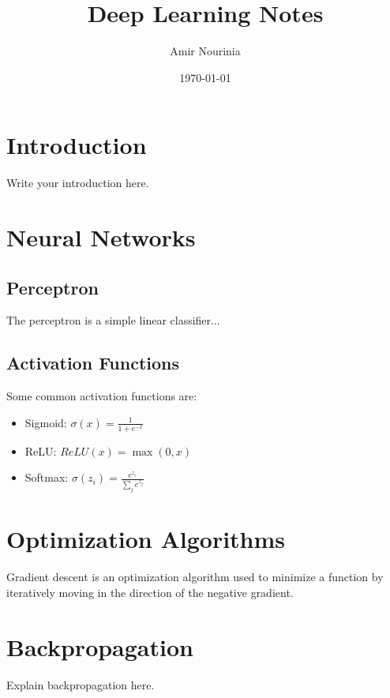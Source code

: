 \documentclass[a4paper,12pt]{article}
\title{Deep Learning Notes}
\author{Amir Nourinia}
\date{\today}
\begin{document}
\maketitle

\tableofcontents

\newpage

\section{Introduction}
Write your introduction here.

\section{Neural Networks}

\subsection{Perceptron}
The perceptron is a simple linear classifier...

\subsection{Activation Functions}
Some common activation functions are:
\begin{itemize}
    \item Sigmoid: $\sigma(x) = \frac{1}{1+e^{-x}}$
    \item ReLU: $ReLU(x) = \max(0, x)$
    \item Softmax: $\sigma(z_i) = \frac{e^{z_i}}{\sum_{j} e^{z_j}}$
\end{itemize}

\section{Optimization Algorithms}

\begin{tcolorbox}[colback=blue!5!white,colframe=blue!75!black,title=Gradient Descent]
Gradient descent is an optimization algorithm used to minimize a function by iteratively moving in the direction of the negative gradient.
\end{tcolorbox}

\section{Backpropagation}
Explain backpropagation here.
\end{document}
